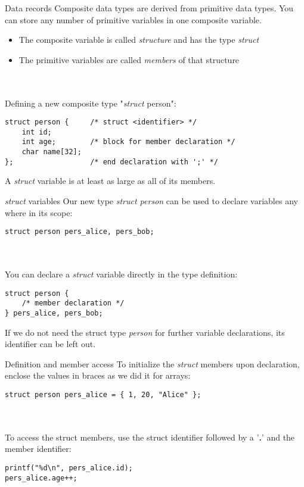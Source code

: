 \begin{frame}[fragile]{Data records}
	Composite data types are derived from primitive data types. You can store any number of primitive variables in one composite variable.
	\begin{itemize}
		\item The composite variable is called \textit{structure} and has the type \textit{struct}
		\item The primitive variables are called \textit{members} of that structure
	\end{itemize} \ \\ \ \\
	Defining a new composite type "\textit{struct} person":
	\begin{lstlisting}[numbers=none]
struct person {		/* struct <identifier> */
	int id;
	int age;		/* block for member declaration */
	char name[32];
};					/* end declaration with ';' */
\end{lstlisting}
	A \textit{struct} variable is at least as large as all of its members.
\end{frame}
\begin{frame}[fragile]{\textit{struct} variables}
	Our new type \textit{struct person} can be used to declare variables any where in its scope:
	\begin{lstlisting}[numbers=none]
struct person pers_alice, pers_bob;
\end{lstlisting} \ \\ \ \\
	You can declare a \textit{struct} variable directly in the type definition:
	\begin{lstlisting}[numbers=none]
struct person {
	/* member declaration */
} pers_alice, pers_bob;
\end{lstlisting}
	If we do not need the struct type \textit{person} for further variable declarations, its identifier can be left out.
\end{frame}
\begin{frame}[fragile]{Definition and member access}
	To initialize the \textit{struct} members upon declaration, enclose the values in braces as we did it for arrays:
	\begin{lstlisting}[numbers=none]
struct person pers_alice = { 1, 20, "Alice" };
\end{lstlisting} \ \\ \ \\
	To access the struct members, use the struct identifier followed by a '\textbf{.}' and the member identifier:
	\begin{lstlisting}[numbers=none]
printf("%d\n", pers_alice.id);
pers_alice.age++;
\end{lstlisting}
\end{frame}
